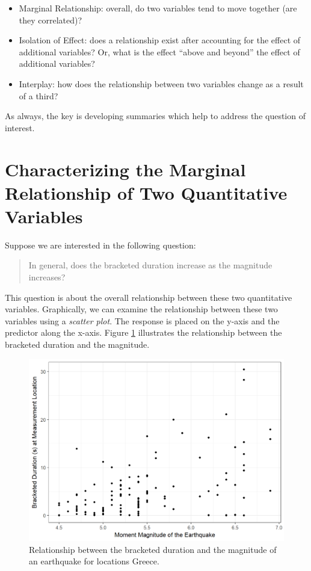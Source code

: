 \documentclass[]{book}
\providecommand{\tightlist}{%
  \setlength{\itemsep}{0pt}\setlength{\parskip}{0pt}}
\theoremstyle{plain}
\theoremstyle{mydefn}
\theoremstyle{myexmpl}
\theoremstyle{remark}
\begin{document}
\begin{itemize}
\tightlist
\item
  Marginal Relationship: overall, do two variables tend to move together
  (are they correlated)?
\item
  Isolation of Effect: does a relationship exist after accounting for
  the effect of additional variables? Or, what is the effect ``above and
  beyond'' the effect of additional variables?
\item
  Interplay: how does the relationship between two variables change as a
  result of a third?
\end{itemize}

As always, the key is developing summaries which help to address the
question of interest.

\section{Characterizing the Marginal Relationship of Two Quantitative
Variables}\label{characterizing-the-marginal-relationship-of-two-quantitative-variables}

Suppose we are interested in the following question:

\begin{quote}
In general, does the bracketed duration increase as the magnitude
increases?
\end{quote}

This question is about the overall relationship between these two
quantitative variables. Graphically, we can examine the relationship
between these two variables using a \emph{scatter plot}. The response is
placed on the y-axis and the predictor along the x-axis. Figure
\ref{fig:regsummaries-magnitude} illustrates the relationship between
the bracketed duration and the magnitude.

\begin{figure}

{\centering \includegraphics[width=0.8\linewidth]{./Images/regsummaries-magnitude-1} 

}

\caption{Relationship between the bracketed duration and the magnitude of an earthquake for locations Greece.}\label{fig:regsummaries-magnitude}
\end{figure}
\end{document}

